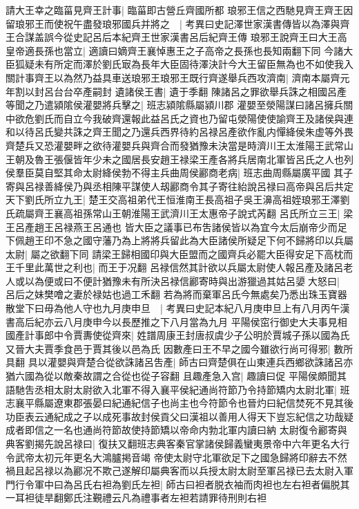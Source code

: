 請大王幸之臨菑見齊王計事|{
	臨菑即古營丘齊國所都}
琅邪王信之西馳見齊王齊王因留琅邪王而使祝午盡發琅邪國兵并將之　|{
	考異曰史記澤世家漢書傳皆以為澤與齊王合謀盖誤今從史記呂后本紀齊王世家漢書呂后紀齊王傳}
琅邪王說齊王曰大王高皇帝適長孫也當立|{
	適讀曰嫡齊王襄悼惠王之子高帝之長孫也長知兩翻下同}
今諸大臣狐疑未有所定而澤於劉氏㝡為長年大臣固待澤決計今大王留臣無為也不如使我入關計事齊王以為然乃益具車送琅邪王琅邪王既行齊遂舉兵西攻濟南|{
	濟南本屬齊元年割以封呂台台卒產嗣封}
遺諸侯王書|{
	遺于季翻}
陳諸呂之罪欲舉兵誅之相國呂產等聞之乃遣潁隂侯灌嬰將兵擊之|{
	班志潁隂縣屬潁川郡}
灌嬰至滎陽謀曰諸呂擁兵關中欲危劉氏而自立今我破齊還報此益呂氏之資也乃留屯滎陽使使諭齊王及諸侯與連和以待呂氏變共誅之齊王聞之乃還兵西界待約呂禄呂產欲作亂内憚絳侯朱虚等外畏齊楚兵又恐灌嬰畔之欲待灌嬰兵與齊合而發猶豫未決當是時濟川王太淮陽王武常山王朝及魯王張偃皆年少未之國居長安趙王禄梁王產各將兵居南北軍皆呂氏之人也列侯羣臣莫自堅其命太尉絳侯勃不得主兵曲周侯酈商老病|{
	班志曲周縣屬廣平國}
其子寄與呂禄善絳侯乃與丞相陳平謀使人刼酈商令其子寄往紿說呂禄曰高帝與呂后共定天下劉氏所立九王|{
	楚王交高祖弟代王恒淮南王長高祖子吳王濞高祖姪琅邪王澤劉氏疏屬齊王襄高祖孫常山王朝淮陽王武濟川王太惠帝子說式芮翻}
呂氏所立三王|{
	梁王呂產趙王呂禄燕王呂通也}
皆大臣之議事已布吿諸侯皆以為宜今太后崩帝少而足下佩趙王印不急之國守藩乃為上將將兵留此為大臣諸侯所疑足下何不歸將印以兵屬太尉|{
	屬之欲翻下同}
請梁王歸相國印與大臣盟而之國齊兵必罷大臣得安足下高枕而王千里此萬世之利也|{
	而王于况翻}
呂禄信然其計欲以兵屬太尉使人報呂產及諸呂老人或以為便或曰不便計猶豫未有所決呂禄信酈寄時與出游獵過其姑呂嬃大怒曰|{
	呂后之妹樊噲之妻於禄姑也過工禾翻}
若為將而棄軍呂氏今無處矣乃悉出珠玉寶器散堂下曰毋為他人守也九月庚申旦　|{
	考異曰史記本紀八月庚申旦上有八月丙午漢書高后紀亦云八月庚申今以長歷推之下八月當為九月}
平陽侯窋行御史大夫事見相國產計事郎中令賈夀使從齊來|{
	姓譜周康王封唐叔虞少子公明於賈城子孫以國為氏又晉大夫賈季食邑于賈其後以邑為氏}
因數產曰王不早之國今雖欲行尚可得邪|{
	數所具翻}
具以灌嬰與齊楚合從欲誅諸呂吿產|{
	師古曰齊楚俱在山東連兵西鄉欲誅諸呂亦猶六國為從以敵秦故謂之合從也從子容翻}
且趣產急入宫|{
	趣讀曰促}
平陽侯頗聞其語馳吿丞相太尉太尉欲入北軍不得入襄平侯紀通尚符節乃令持節矯内太尉北軍|{
	班志襄平縣屬遼東郡張晏曰紀通紀信子也尚主也今符節令也晉灼曰紀信焚死不見其後功臣表云通紀成之子以成死事故封侯貢父曰漢祖以善用人得天下豈忘紀信之功哉疑成者即信之一名也通尚符節故使持節矯以帝命内勃北軍内讀曰納}
太尉復令酈寄與典客劉揭先說呂禄曰|{
	復扶又翻班志典客秦官掌諸侯歸義蠻夷景帝中六年更名大行令武帝太初元年更名大鴻臚掲音竭}
帝使太尉守北軍欲足下之國急歸將印辭去不然禍且起呂禄以為酈况不欺己遂解印屬典客而以兵授太尉太尉至軍呂禄已去太尉入軍門行令軍中曰為呂氏右袒為劉氏左袒|{
	師古曰袒者脱衣袖而肉袒也左右袒者偏脱其一耳袒徒旱翻鄭氏注覲禮云凡為禮事者左袒若請罪待刑則右袒}
